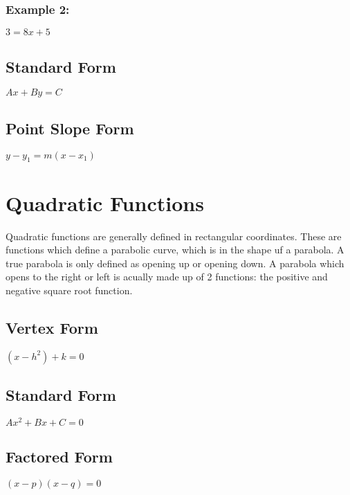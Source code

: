 \documentclass[11pt]{article}
\begin{document}
        \subsubsection{Example 2:}
            $3 = 8x + 5$
    \subsection{Standard Form}
        $ Ax + By = C $
    \subsection{Point Slope Form}
        $ y - y_1 = m(x - x_1) $
\section{Quadratic Functions}
    Quadratic functions are generally defined in rectangular coordinates. These are functions which define a
parabolic curve, which is in the shape uf a parabola. A true parabola is only defined as opening up or opening down.
A parabola which opens to the right or left is acually made up of 2 functions: the positive and negative square
root function.
    \subsection{Vertex Form}
        $ (x - h^2) + k = 0 $
    \subsection{Standard Form}
        $ Ax^2 + Bx + C = 0 $
    \subsection{Factored Form}
        $ (x - p)(x - q) = 0 $
\end{document}
